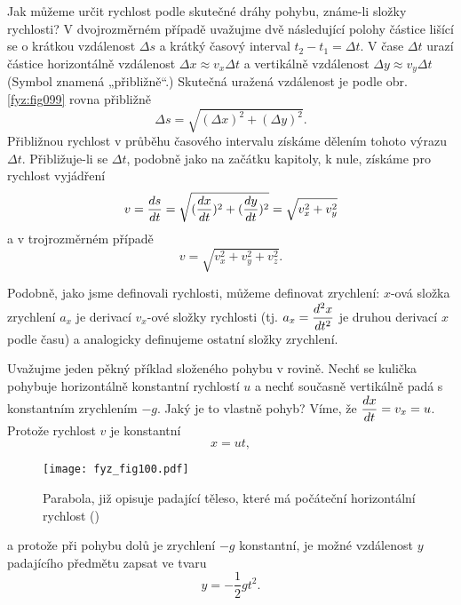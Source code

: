     Jak můžeme určit rychlost podle skutečné dráhy pohybu, známe-li složky rychlosti? V 
    dvojrozměrném případě uvažujme dvě následující polohy částice lišící se o krátkou vzdálenost 
    \(\Delta s\) a krátký časový interval \(t_2- t_1 = \Delta t\). V čase \(\Delta t\) urazí 
    částice horizontálně vzdálenost \(\Delta x \approx  v_x\Delta t\) a vertikálně vzdálenost 
    \(\Delta y \approx  v_y\Delta t\) (Symbol \uv{\(\approx\)} znamená „přibližně“.) Skutečná 
    uražená vzdálenost je podle obr. \ref{fyz:fig099} rovna přibližně
    \begin{equation}\label{fyz:eq109}
      \Delta s = \sqrt{(\Delta x)^2 + (\Delta y)^2}.
    \end{equation}
    Přibližnou rychlost v průběhu časového intervalu získáme dělením tohoto výrazu \(\Delta t\). 
    Přibližuje-li se \(\Delta t\), podobně jako na začátku kapitoly, k nule, získáme pro rychlost 
    vyjádření
    \begin{equation}\label{fyz:eq110}
      v = \dfrac{d s}{d t} = \sqrt{(\dfrac{d x}{d t})^2 + (\dfrac{d y}{d t})^2} = \sqrt{v_x^2 + v_y^2}
    \end{equation}
    a v trojrozměrném případě
    \begin{equation}\label{fyz:eq097}
      v = \sqrt{v_x^2 + v_y^2 + v_z^2}.
    \end{equation}

    Podobně, jako jsme definovali rychlosti, můžeme definovat zrychlení: \(x\)-ová složka zrychlení 
    \(a_x\) je derivací \(v_x\)-ové složky rychlosti (tj. \(a_x = \dfrac{d^2 x}{d t^2}\) je druhou derivací 
    \(x\) podle času) a analogicky definujeme ostatní složky zrychlení.

    Uvažujme jeden pěkný příklad složeného pohybu v rovině. Nechť se kulička pohybuje horizontálně 
    konstantní rychlostí \(u\) a nechť současně vertikálně padá s konstantním zrychlením \(-g\). 
    Jaký je to vlastně pohyb? Víme, že \(\dfrac{d x}{d t} = v_x = u\). Protože rychlost \(v\) je 
    konstantní
    \begin{equation}\label{fyz:eq100}
      x = ut,
    \end{equation}

    \begin{figure}[ht!] %
      \centering
      \texttt{[image: fyz\_fig100.pdf]}
      \caption{Parabola, již opisuje padající těleso, které má počáteční horizontální rychlost
               (\cite[s.~119]{Feynman01})}
      \label{fyz:fig100}
    \end{figure}
    a protože při pohybu dolů je zrychlení \(-g\) konstantní, je možné vzdálenost \(y\) padajícího 
    předmětu zapsat ve tvaru
    \begin{equation}\label{fyz:eq098}
      y = -\frac{1}{2}gt^2.
    \end{equation}
    
